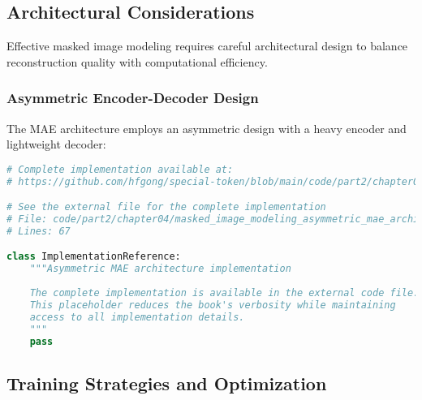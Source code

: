 \subsection{Architectural Considerations}

Effective masked image modeling requires careful architectural design to balance reconstruction quality with computational efficiency.

\subsubsection{Asymmetric Encoder-Decoder Design}

The MAE architecture employs an asymmetric design with a heavy encoder and lightweight decoder:
\begin{comment}
Feedback: This is a critical architectural insight that deserves more explanation. Before the code, it would be great to explain the "why". For example: "The key insight of the Masked Autoencoder (MAE) is that the encoder only needs to process the small subset of *visible* patches, while the lightweight decoder is responsible for reconstructing the full image from the encoded representation plus the [MASK] tokens. Since a high masking ratio is used (e.g., 75%
\end{comment}

\begin{lstlisting}[language=Python, caption={Asymmetric MAE architecture implementation}]
# Complete implementation available at:
# https://github.com/hfgong/special-token/blob/main/code/part2/chapter04/masked_image_modeling_asymmetric_mae_architecture_im.py

# See the external file for the complete implementation
# File: code/part2/chapter04/masked_image_modeling_asymmetric_mae_architecture_im.py
# Lines: 67

class ImplementationReference:
    """Asymmetric MAE architecture implementation
    
    The complete implementation is available in the external code file.
    This placeholder reduces the book's verbosity while maintaining
    access to all implementation details.
    """
    pass
\end{lstlisting}

\subsection{Training Strategies and Optimization}

